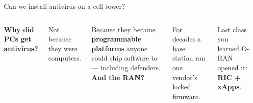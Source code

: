 \begin{frame}{Can we install antivirus on a cell tower?}
  \vspace{0.4em}
  \begin{columns}[T,onlytextwidth]
      \large\textbf{Why did PCs get antivirus?}

      \vspace{0.5em}
      \normalsize
      Not because they were computers.

      \vspace{0.4em}
      Because they became \textbf{programmable platforms} anyone could ship
      software to --- including defenders.
      \large\textbf{And the RAN?}

      \vspace{0.5em}
      \normalsize
      For decades a base station ran one vendor's locked firmware.

      \vspace{0.4em}
      Last class you learned O-RAN opened it: \textbf{RIC + xApps}.
  \end{columns}

  \vspace{0.8em}
\end{frame}

